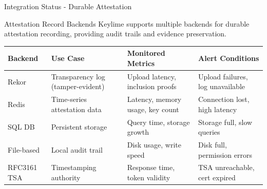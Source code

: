 \begin{frame}{Integration Status - Durable Attestation}
  \begin{block}{Attestation Record Backends}
    \scriptsize
    Keylime supports multiple backends for durable attestation recording,
    providing audit trails and evidence preservation.
  \end{block}

  \vspace{0.1cm}

  \scriptsize
  \begin{center}
    \begin{tabular}{|l|p{3cm}|p{2.5cm}|p{2.5cm}|}
      \hline
      \textbf{Backend} & \textbf{Use Case} & \textbf{Monitored Metrics} & \textbf{Alert Conditions} \\
      \hline
      \hline
      Rekor & Transparency log (tamper-evident) & Upload latency, inclusion proofs & Upload failures, log unavailable \\
      \hline
      Redis & Time-series attestation data & Latency, memory usage, key count & Connection lost, high latency \\
      \hline
      SQL DB & Persistent storage & Query time, storage growth & Storage full, slow queries \\
      \hline
      File-based & Local audit trail & Disk usage, write speed & Disk full, permission errors \\
      \hline
      RFC3161 TSA & Timestamping authority & Response time, token validity & TSA unreachable, cert expired \\
      \hline
    \end{tabular}
  \end{center}

  \vspace{0.2cm}


\end{frame}

